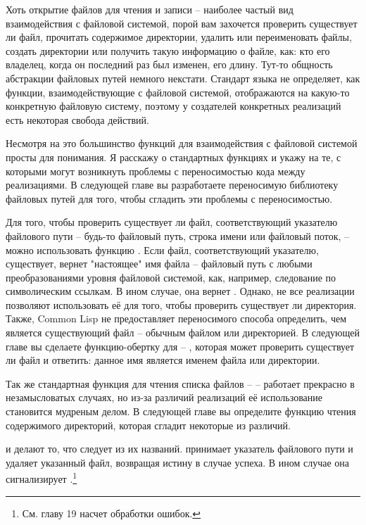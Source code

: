Хоть открытие файлов для чтения и записи -- наиболее частый вид взаимодействия с файловой
системой, порой вам захочется проверить существует ли файл, прочитать содержимое
директории, удалить или переименовать файлы, создать директории или получить такую
информацию о файле, как: кто его владелец, когда он последний раз был изменен, его
длину. Тут-то общность абстракции файловых путей немного некстати. Стандарт языка не
определяет, как функции, взаимодействующие с файловой системой, отображаются на какую-то
конкретную файловую систему, поэтому у создателей конкретных реализаций есть некоторая
свобода действий.

Несмотря на это большинство функций для взаимодействия с файловой системой просты для
понимания. Я расскажу о стандартных функциях и укажу на те, с которыми могут возникнуть
проблемы с переносимостью кода между реализациями. В следующей главе вы разработаете
переносимую библиотеку файловых путей для того, чтобы сгладить эти проблемы с
переносимостью.

Для того, чтобы проверить существует ли файл, соответствующий указателю файлового пути --
будь-то файловый путь, строка имени или файловый поток, -- можно использовать функцию
. Если файл, соответствующий указателю, существует, 
вернет "настоящее" имя файла -- файловый путь с любыми преобразованиями уровня файловой
системой, как, например, следование по символическим ссылкам. В ином случае, она вернет
. Однако, не все реализации позволяют использовать её для того, чтобы проверить
существует ли директория. Также, Common Lisp не предоставляет переносимого способа
определить, чем является существующий файл -- обычным файлом или директорией. В следующей
главе вы сделаете функцию-обертку для  -- , которая
может проверить существует ли файл и ответить: данное имя является именем файла или
директории.

Так же стандартная функция для чтения списка файлов --  -- работает
прекрасно в незамысловатых случаях, но из-за различий реализаций её использование
становится мудреным делом. В следующей главе вы определите функцию чтения содержимого
директорий, которая сгладит некоторые из различий.

 и  делают то, что следует из их
названий.  принимает указатель файлового пути и удаляет указанный файл,
возвращая истину в случае успеха. В ином случае она сигнализирует
.\footnote{См. главу 19 насчет обработки ошибок.}

